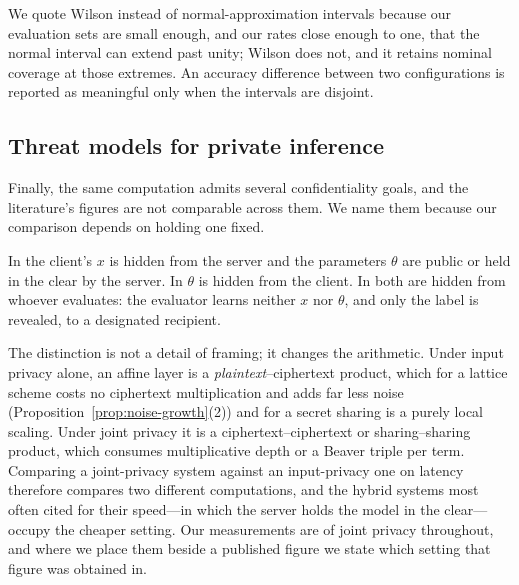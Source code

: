 We quote Wilson instead of normal-approximation intervals because our evaluation
sets are small enough, and our rates close enough to one, that the normal interval
can extend past unity; Wilson does not, and it retains nominal coverage at those
extremes. An accuracy difference between two configurations is reported as
meaningful only when the intervals are disjoint.

\subsection{Threat models for private inference}
\label{sec:ml:threat}

Finally, the same computation admits several confidentiality goals, and the
literature's figures are not comparable across them. We name them because our
comparison depends on holding one fixed.

\begin{definition}
\label{def:pi-models}
In  the client's $x$ is hidden from the server and the
parameters $\theta$ are public or held in the clear by the server. In  $\theta$ is hidden from the client. In  both are
hidden from whoever evaluates: the evaluator learns neither $x$ nor $\theta$, and
only the label is revealed, to a designated recipient.
\end{definition}

\begin{remark}
\label{rem:pi-cost}
The distinction is not a detail of framing; it changes the arithmetic. Under input
privacy alone, an affine layer is a \emph{plaintext}--ciphertext product, which for
a lattice scheme costs no ciphertext multiplication and adds far less noise
(Proposition~\ref{prop:noise-growth}(2)) and for a secret sharing is a purely
local scaling. Under joint privacy it is a ciphertext--ciphertext or
sharing--sharing product, which consumes multiplicative depth or a Beaver triple
per term. Comparing a joint-privacy system against an input-privacy one on
latency therefore compares two different computations, and the hybrid systems most
often cited for their speed---in which the server holds the model in the
clear---occupy the cheaper setting. Our measurements are of joint privacy
throughout, and where we place them beside a published figure we state which
setting that figure was obtained in.
\end{remark}
